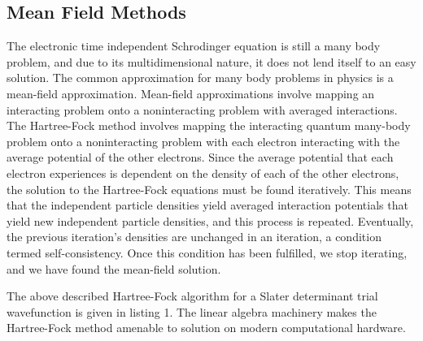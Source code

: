 \subsection{Mean Field Methods}
The electronic time independent Schrodinger equation is still a many body problem, and due to its multidimensional nature, it does not lend itself to an easy solution.
The common approximation for many body problems in physics is a mean-field approximation.
Mean-field approximations involve mapping an interacting problem onto a noninteracting problem with averaged interactions.
The Hartree-Fock method involves mapping the interacting quantum many-body problem onto a noninteracting problem with each electron interacting with the average potential of the other electrons.
Since the average potential that each electron experiences is dependent on the density of each of the other electrons, the solution to the Hartree-Fock equations must be found iteratively.
This means that the independent particle densities yield averaged interaction potentials that yield new independent particle densities, and this process is repeated.
Eventually, the previous iteration's densities are unchanged in an iteration, a condition termed self-consistency.
Once this condition has been fulfilled, we stop iterating, and we have found the mean-field solution.

The above described Hartree-Fock algorithm for a Slater determinant trial wavefunction is given in listing 1.
The linear algebra machinery makes the Hartree-Fock method amenable to solution on modern computational hardware.
